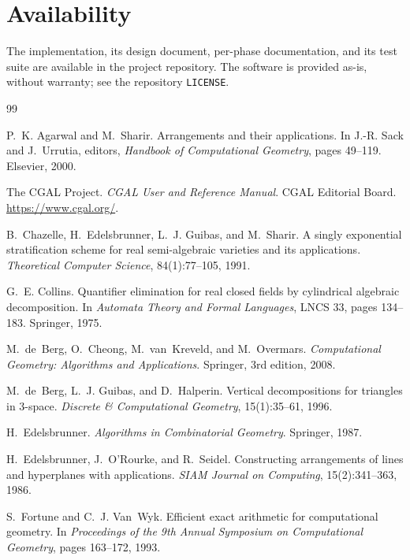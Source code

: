 \documentclass[11pt]{article}
\begin{document}
\section*{Availability}

The implementation, its design document, per-phase documentation, and its test
suite are available in the project repository.  The software is provided as-is,
without warranty; see the repository \texttt{LICENSE}.

\begin{thebibliography}{99}

P.~K. Agarwal and M.~Sharir.
\newblock Arrangements and their applications.
\newblock In J.-R. Sack and J.~Urrutia, editors, \emph{Handbook of
  Computational Geometry}, pages 49--119. Elsevier, 2000.

The CGAL Project.
\newblock \emph{CGAL User and Reference Manual}.
\newblock CGAL Editorial Board.
\newblock \url{https://www.cgal.org/}.

B.~Chazelle, H.~Edelsbrunner, L.~J. Guibas, and M.~Sharir.
\newblock A singly exponential stratification scheme for real semi-algebraic
  varieties and its applications.
\newblock \emph{Theoretical Computer Science}, 84(1):77--105, 1991.

G.~E. Collins.
\newblock Quantifier elimination for real closed fields by cylindrical
  algebraic decomposition.
\newblock In \emph{Automata Theory and Formal Languages}, LNCS 33, pages
  134--183. Springer, 1975.

M.~de~Berg, O.~Cheong, M.~van~Kreveld, and M.~Overmars.
\newblock \emph{Computational Geometry: Algorithms and Applications}.
\newblock Springer, 3rd edition, 2008.

M.~de~Berg, L.~J. Guibas, and D.~Halperin.
\newblock Vertical decompositions for triangles in 3-space.
\newblock \emph{Discrete \& Computational Geometry}, 15(1):35--61, 1996.

H.~Edelsbrunner.
\newblock \emph{Algorithms in Combinatorial Geometry}.
\newblock Springer, 1987.

H.~Edelsbrunner, J.~O'Rourke, and R.~Seidel.
\newblock Constructing arrangements of lines and hyperplanes with applications.
\newblock \emph{SIAM Journal on Computing}, 15(2):341--363, 1986.

S.~Fortune and C.~J. Van~Wyk.
\newblock Efficient exact arithmetic for computational geometry.
\newblock In \emph{Proceedings of the 9th Annual Symposium on Computational
  Geometry}, pages 163--172, 1993.


\end{thebibliography}
\end{document}

